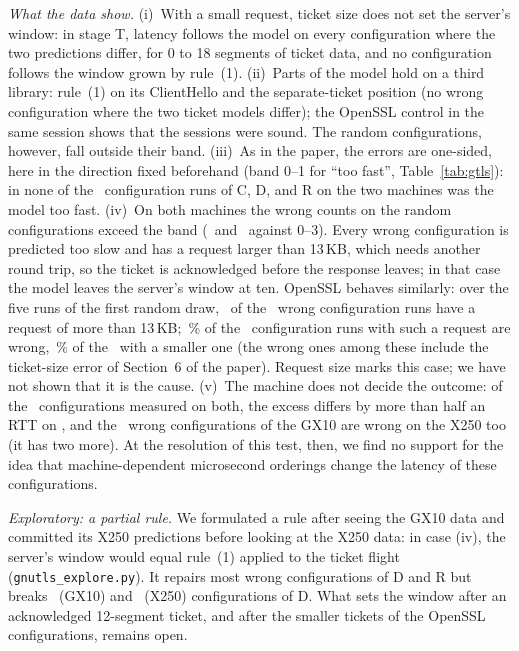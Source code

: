 \documentclass[9pt]{article}
\begin{document}
\emph{What the data show.} (i)~With a small request, ticket size does not set the server's window: in stage T, latency follows the model on every configuration where the two predictions differ, for 0 to 18 segments of ticket data, and no configuration follows the window grown by rule~(1). (ii)~Parts of the model hold on a third library: rule~(1) on its ClientHello and the separate-ticket position (no wrong configuration where the two ticket models differ); the OpenSSL control in the same session shows that the sessions were sound. The random configurations, however, fall outside their band. (iii)~As in the paper, the errors are one-sided, here in the direction fixed beforehand (band 0--1 for ``too fast'', Table~\ref{tab:gtls}): in none of the \GtlsFastCellRuns\ configuration runs of C, D, and R on the two machines was the model too fast. (iv)~On both machines the wrong counts on the random configurations exceed the band (\GtlsARWrong\ and \GtlsXRWrong\ against 0--3). Every wrong configuration is predicted too slow and has a request larger than 13\,KB, which needs another round trip, so the ticket is acknowledged before the response leaves; in that case the model leaves the server's window at ten. OpenSSL behaves similarly: over the five runs of the first random draw, \DomLargeWrong\ of the \DomWrongTotal\ wrong configuration runs have a request of more than 13\,KB; \DomLargePct\,\% of the \DomLargeN\ configuration runs with such a request are wrong, \DomRestPct\,\% of the \DomRestN\ with a smaller one (the wrong ones among these include the ticket-size error of Section~6 of the paper). Request size marks this case; we have not shown that it is the cause. (v)~The machine does not decide the outcome: of the \GtlsBothCells\ configurations measured on both, the excess differs by more than half an RTT on \GtlsBothDiffer, and the \GtlsSharedWrong\ wrong configurations of the GX10 are wrong on the X250 too (it has two more). At the resolution of this test, then, we find no support for the idea that machine-dependent microsecond orderings change the latency of these configurations.

\emph{Exploratory: a partial rule.} We formulated a rule after seeing the GX10 data and committed its X250 predictions before looking at the X250 data: in case (iv), the server's window would equal rule~(1) applied to the ticket flight (\texttt{gnutls\_explore.py}). It repairs most wrong configurations of D and R but breaks \GtlsAHackDBroke\ (GX10) and \GtlsXHackDBroke\ (X250) configurations of D. What sets the window after an acknowledged 12-segment ticket, and after the smaller tickets of the OpenSSL configurations, remains open.
\end{document}
